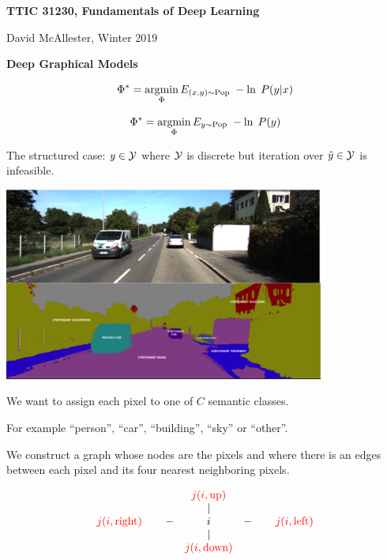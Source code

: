 




{\Huge

  \centerline{\bf TTIC 31230, Fundamentals of Deep Learning}
  \bigskip
  \centerline{David McAllester, Winter 2019}
  \vfill
  \vfill
  \centerline{\bf Deep Graphical Models}
\vfill
\vfill
\vfill


\vfill
{\color{red}
$$\Phi^* = \operatorname*{argmin}_\Phi E_{(x,y) \sim \mathrm{Pop}}\;-\ln \;P(y|x)$$

\vfill
$$\Phi^* = \operatorname*{argmin}_\Phi E_{y \sim \mathrm{Pop}}\;-\ln \;P(y)$$
}

{\color{red} The structured case:} $y \in {\cal Y}$ where ${\cal Y}$ is discrete but {\color{red} iteration over $\hat{y} \in {\cal Y}$ is infeasible}.
\centerline{\includegraphics[height = 2.5in]{../images/SemSeg}}

\vfill
We want to assign each pixel to one of $C$ semantic classes.

\vfill
For example ``person'', ``car'', ``building'', ``sky'' or ``other''.


We construct a graph whose nodes are the pixels and where there is an edges between each pixel and its four nearest neighboring pixels.

\vfill
$$\begin{array}{ccccc}
 & & {\color{red} j(i,\mathrm{up})} \\
 & & | \\
 {\color{red} j(i,\mathrm{right})}\;\;\;\; & -& i & -& \;\;\;\;{\color{red} j(i,\mathrm{left})} \\
 & & | \\
 & & {\color{red} j(i,\mathrm{down})}
 \end{array}$$

}
